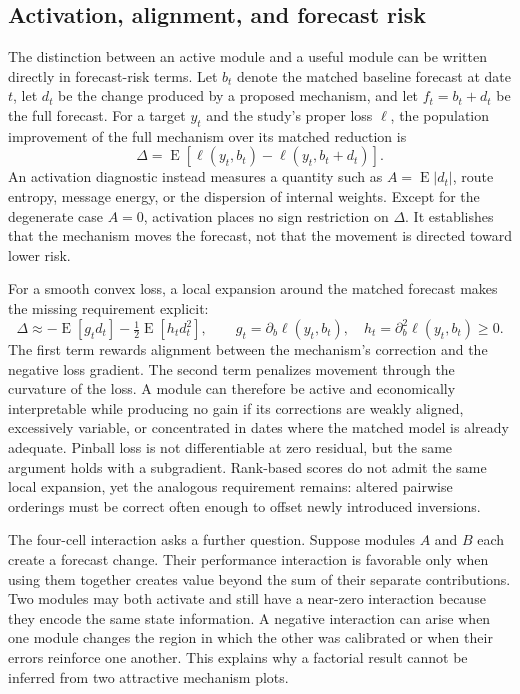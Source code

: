 \documentclass{crebss}
\begin{document}
\subsection{Activation, alignment, and forecast risk}

The distinction between an active module and a useful module can be written directly in forecast-risk terms. Let $b_t$ denote the matched baseline forecast at date $t$, let $d_t$ be the change produced by a proposed mechanism, and let $f_t=b_t+d_t$ be the full forecast. For a target $y_t$ and the study's proper loss $\ell$, the population improvement of the full mechanism over its matched reduction is
\[
  \Delta = \operatorname{E}\!\left[\ell(y_t,b_t)-\ell(y_t,b_t+d_t)\right].
\]
An activation diagnostic instead measures a quantity such as $A=\operatorname{E}|d_t|$, route entropy, message energy, or the dispersion of internal weights. Except for the degenerate case $A=0$, activation places no sign restriction on $\Delta$. It establishes that the mechanism moves the forecast, not that the movement is directed toward lower risk.

For a smooth convex loss, a local expansion around the matched forecast makes the missing requirement explicit:
\[
  \Delta \approx -\operatorname{E}[g_t d_t]
  -\tfrac{1}{2}\operatorname{E}[h_t d_t^2],
  \qquad
  g_t=\partial_b\ell(y_t,b_t),\quad h_t=\partial_b^2\ell(y_t,b_t)\geq 0.
\]
The first term rewards alignment between the mechanism's correction and the negative loss gradient. The second term penalizes movement through the curvature of the loss. A module can therefore be active and economically interpretable while producing no gain if its corrections are weakly aligned, excessively variable, or concentrated in dates where the matched model is already adequate. Pinball loss is not differentiable at zero residual, but the same argument holds with a subgradient. Rank-based scores do not admit the same local expansion, yet the analogous requirement remains: altered pairwise orderings must be correct often enough to offset newly introduced inversions.

The four-cell interaction asks a further question. Suppose modules $A$ and $B$ each create a forecast change. Their performance interaction is favorable only when using them together creates value beyond the sum of their separate contributions. Two modules may both activate and still have a near-zero interaction because they encode the same state information. A negative interaction can arise when one module changes the region in which the other was calibrated or when their errors reinforce one another. This explains why a factorial result cannot be inferred from two attractive mechanism plots.
\end{document}
